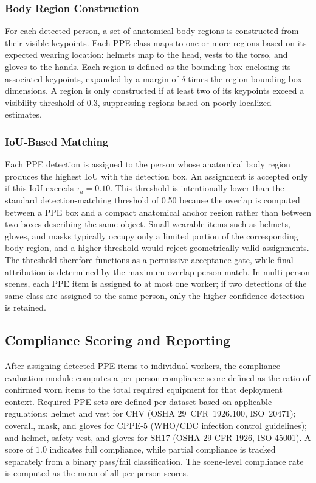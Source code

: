 \documentclass[conference]{IEEEtran}
\begin{document}
\subsubsection{Body Region Construction}
For each detected person, a set of anatomical body regions is constructed from their visible keypoints. Each PPE class maps to one or more regions based on its expected wearing location: helmets map to the head, vests to the torso, and gloves to the hands. Each region is defined as the bounding box enclosing its associated keypoints, expanded by a margin of $\delta$ times the region bounding box dimensions. A region is only constructed if at least two of its keypoints exceed a visibility threshold of 0.3, suppressing regions based on poorly localized estimates.


\subsubsection{IoU-Based Matching}
Each PPE detection is assigned to the person whose
anatomical body region produces the highest IoU with the
detection box. An assignment is accepted only if this IoU
exceeds $\tau_a = 0.10$. This threshold is intentionally
lower than the standard detection-matching threshold of 0.50
because the overlap is computed between a PPE box and a
compact anatomical anchor region rather than between two
boxes describing the same object. Small wearable items such
as helmets, gloves, and masks typically occupy only a
limited portion of the corresponding body region, and a
higher threshold would reject geometrically valid
assignments. The threshold therefore functions as a
permissive acceptance gate, while final attribution is
determined by the maximum-overlap person match. In
multi-person scenes, each PPE item is assigned to at most
one worker; if two detections of the same class are assigned
to the same person, only the higher-confidence detection
is retained.



\subsection{Compliance Scoring and Reporting}
After assigning detected PPE items to individual workers, the compliance evaluation module computes a per-person compliance score defined as the ratio of confirmed worn items to the total required equipment for that deployment context.  Required PPE sets are defined per dataset based on applicable regulations: helmet and vest for CHV (OSHA 29~CFR~1926.100, ISO~20471); coverall, mask, and gloves for CPPE-5 (WHO/CDC infection control guidelines); and helmet, safety-vest, and gloves for SH17 (OSHA 29 CFR 1926, ISO 45001).  A score of $1.0$ indicates full compliance, while partial compliance is tracked separately from a binary pass/fail classification.  The scene-level compliance rate is computed as the mean of all per-person scores.
\end{document}
